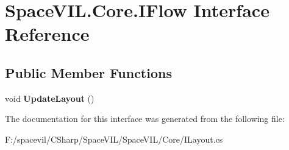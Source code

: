 \hypertarget{interface_space_v_i_l_1_1_core_1_1_i_flow}{}\section{Space\+V\+I\+L.\+Core.\+I\+Flow Interface Reference}
\label{interface_space_v_i_l_1_1_core_1_1_i_flow}
\subsection*{Public Member Functions}
\begin{DoxyCompactItemize}
\item 
\mbox{\label{interface_space_v_i_l_1_1_core_1_1_i_flow_a0fd72e5cbb0d9118ec3b55cfc13e9743}} 
void {\bfseries Update\+Layout} ()
\end{DoxyCompactItemize}


The documentation for this interface was generated from the following file\+:\begin{DoxyCompactItemize}
\item 
F\+:/spacevil/\+C\+Sharp/\+Space\+V\+I\+L/\+Space\+V\+I\+L/\+Core/I\+Layout.\+cs\end{DoxyCompactItemize}
